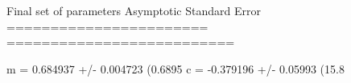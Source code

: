 Final set of parameters            Asymptotic Standard Error
=======================            ==========================

m               = 0.684937         +/- 0.004723     (0.6895%
c               = -0.379196        +/- 0.05993      (15.8%
